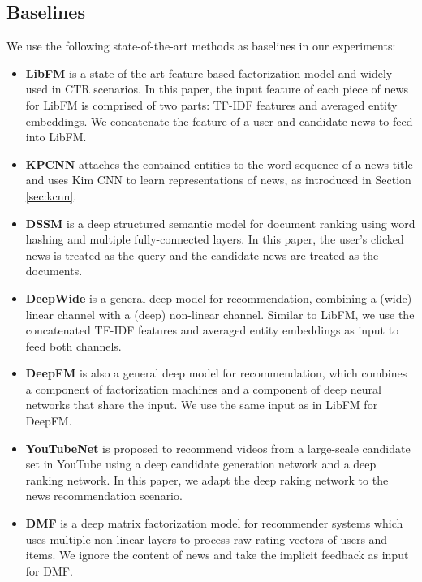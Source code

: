 \documentclass[sigconf]{acmart}
\begin{document}
	
	\subsection{Baselines}
		We use the following state-of-the-art methods as baselines in our experiments:
		\begin{itemize}
			\item
				\textbf{LibFM} \cite{rendle2012factorization} is a state-of-the-art feature-based factorization model and widely used in CTR scenarios.
				In this paper, the input feature of each piece of news for LibFM is comprised of two parts: TF-IDF features and averaged entity embeddings.
				We concatenate the feature of a user and candidate news to feed into LibFM.
			\item
				\textbf{KPCNN} \cite{wang2017combining} attaches the contained entities to the word sequence of a news title and uses Kim CNN to learn representations of news, as introduced in Section \ref{sec:kcnn}.
			\item
				\textbf{DSSM} \cite{huang2013learning} is a deep structured semantic model for document ranking using word hashing and multiple fully-connected layers.
				In this paper, the user's clicked news is treated as the query and the candidate news are treated as the documents.
			\item
				\textbf{DeepWide} \cite{cheng2016wide} is a general deep model for recommendation, combining a (wide) linear channel with a (deep) non-linear channel.
				Similar to LibFM, we use the concatenated TF-IDF features and averaged entity embeddings as input to feed both channels.
			\item
				\textbf{DeepFM} \cite{guo2017deepfm} is also a general deep model for recommendation, which combines a component of factorization machines and a component of deep neural networks that share the input.
				We use the same input as in LibFM for DeepFM.
			\item
				\textbf{YouTubeNet} \cite{covington2016deep} is proposed to recommend videos from a large-scale candidate set in YouTube using a deep candidate generation network and a deep ranking network.
				In this paper, we adapt the deep raking network to the news recommendation scenario.
			\item
				\textbf{DMF} \cite{xue2017deep} is a deep matrix factorization model for recommender systems which uses multiple non-linear layers to process raw rating vectors of users and items.
				We ignore the content of news and take the implicit feedback as input for DMF.
		\end{itemize}
		
\end{document}
